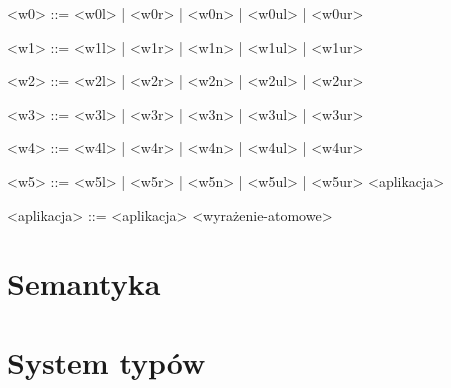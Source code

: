 \documentclass[12pt]{article}
\begin{document}
\begin{grammar}
<w0> ::=
    <w0l> | <w0r> | <w0n> | <w0ul> | <w0ur>

<w1> ::=
    <w1l> | <w1r> | <w1n> | <w1ul> | <w1ur>

<w2> ::=
    <w2l> | <w2r> | <w2n> | <w2ul> | <w2ur>

<w3> ::=
    <w3l> | <w3r> | <w3n> | <w3ul> | <w3ur>

<w4> ::=
    <w4l> | <w4r> | <w4n> | <w4ul> | <w4ur>

<w5> ::=
    <w5l> | <w5r> | <w5n> | <w5ul> | <w5ur>
    \alt <aplikacja>

<aplikacja> ::=
    <aplikacja> <wyrażenie-atomowe>


\end{grammar}

\section{Semantyka}

\section{System typów}
\end{document}
